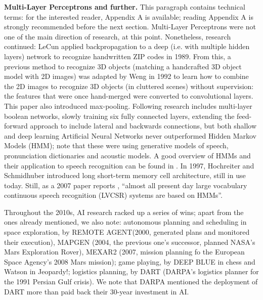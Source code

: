 \documentclass[../main.tex]{subfiles}
\begin{document}
\vspace{4pt}
\textbf{Multi-Layer Perceptrons and further.}
This paragraph contains technical terms: for the interested reader, Appendix A is available; reading Appendix A is strongly recommended before the next section. Multi-Layer Perceptrons were not one of the main direction of research, at this point. Nonetheless, research continued: LeCun applied backpropagation to a deep (i.e. with multiple hidden layers) network to recognize handwritten ZIP codes in 1989\cite{lecunBackpropagationAppliedHandwritten1989}. From this, a previous method to recognize 3D objects (matching a handcrafted 3D object model with 2D images) was adapted by Weng in 1992\cite{wengCresceptronSelforganizingNeural1992} to learn how to combine the 2D images to recognize 3D objects (in cluttered scenes) without supervision: the features that were once hand-merged were converted to convolutional layers. This paper also introduced max-pooling. Following research includes multi-layer boolean networks\cite{decarvalhoIntegratedBooleanNeural1994}, slowly training six fully connected layers\cite{hintonWakesleepAlgorithmUnsupervised1995}, extending the feed-forward approach to include lateral and backwards connections\cite{behnkeNeuralAbstractionPyramid2003}, but both shallow and deep learning Artificial Neural Networks never outperformed Hidden Markov Models (HMM); note that these were using generative models of speech, pronunciation dictionaries and acoustic models. A good overview of HMMs and their application to speech recognition can be found in \cite{galesApplicationHiddenMarkov2007a}.
In 1997, Hochreiter and Schmidhuber introduced long short-term memory cell architecture\cite{hochreiterLongShortTermMemory1997}, still in use today. Still, as a 2007 paper reports \cite{galesApplicationHiddenMarkov2007}, \enquote{almost all present day large vocabulary continuous speech recognition (LVCSR) systems are based on HMMs}.

\vspace{4pt}
Throughout the 2010s, AI research racked up a series of wins; apart from the ones already mentioned, we also note: autonomous planning and scheduling in space exploration, by REMOTE AGENT(2000, generated plans and monitored their execution), MAPGEN (2004, the previous one's successor, planned NASA's Mars Exploration Rover), MEXAR2 (2007, mission planning fo the European Space Agency's 2008 Mars mission); game playing, by DEEP BLUE in chess and Watson in Jeopardy!; logistics planning, by DART (DARPA's logistics planner for the 1991 Persian Gulf crisis). We note that DARPA mentioned the deployment of DART more than paid back their 30-year investment in AI.
\end{document}
